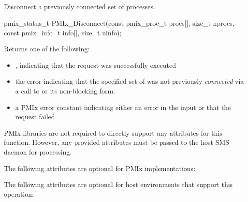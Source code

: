 \subsection{}

\summary

Disconnect a previously connected set of processes.

\format

\cspecificstart
\begin{codepar}
pmix_status_t
PMIx_Disconnect(const pmix_proc_t procs[], size_t nprocs,
                const pmix_info_t info[], size_t ninfo);
\end{codepar}
\cspecificend

\begin{arglist}
\end{arglist}

Returns one of the following:

\begin{itemize}
    \item {}, indicating that the request was successfully executed
    \item the  error indicating that the specified set of  was not previously \textit{connected} via a call to  or its non-blocking form.
    \item a PMIx error constant indicating either an error in the input or that the request failed
\end{itemize}


\reqattrstart
\ac{PMIx} libraries are not required to directly support any attributes for this function. However, any provided attributes must be passed to the host \ac{SMS} daemon for processing.

\reqattrend

\optattrstart
The following attributes are optional for \ac{PMIx} implementations:



The following attributes are optional for host environments that support this operation:

